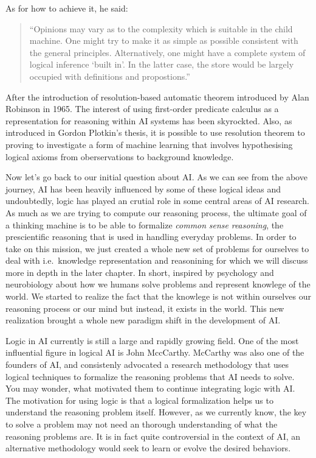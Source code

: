 \documentclass[]{book}
\theoremstyle{definition}
\theoremstyle{definition}
\theoremstyle{definition}
\theoremstyle{remark}
\begin{document}
As for how to achieve it, he said:

\begin{quote}
``Opinions may vary as to the complexity which is suitable in the child
machine. One might try to make it as simple as possible consistent with
the general principles. Alternatively, one might have a complete system
of logical inference `built in'. In the latter case, the store would be
largely occupied with definitions and propostions.''
\end{quote}

After the introduction of resolution-based automatic theorem introduced
by Alan Robinson in 1965. The interest of using first-order predicate
calculus as a representation for reasoning within AI systems has been
skyrockted. Also, as introduced in Gordon Plotkin's thesis, it is
possible to use resolution theorem to proving to investigate a form of
machine learning that involves hypothesising logical axioms from
oberservations to background knowledge.

Now let's go back to our initial question about AI. As we can see from
the above journey, AI has been heavily influenced by some of these
logical ideas and undoubtedly, logic has played an crutial role in some
central areas of AI research. As much as we are trying to compute our
reasoning process, the ultimate goal of a thinking machine is to be able
to formalize \emph{common} \emph{sense} \emph{reasoning}, the
prescientific reasoning that is used in handling everyday problems. In
order to take on this mission, we just created a whole new set of
problems for ourselves to deal with i.e.~knowledge representation and
reasonining for which we will discuss more in depth in the later
chapter. In short, inspired by psychology and neurobiology about how we
humans solve problems and represent knowlege of the world. We started to
realize the fact that the knowlege is not within ourselves our reasoning
process or our mind but instead, it exists in the world. This new
realization brought a whole new paradigm shift in the development of AI.

Logic in AI currently is still a large and rapidly growing field. One of
the most influential figure in logical AI is John MccCarthy. McCarthy
was also one of the founders of AI, and consistenly advocated a research
methodology that uses logical techniques to formalize the reasoning
problems that AI needs to solve. You may wonder, what motivated them to
continue integrating logic with AI. The motivation for using logic is
that a logical formalization helps us to understand the reasoning
problem itself. However, as we currently know, the key to solve a
problem may not need an thorough understanding of what the reasoning
problems are. It is in fact quite controversial in the context of AI, an
alternative methodology would seek to learn or evolve the desired
behaviors.
\end{document}
